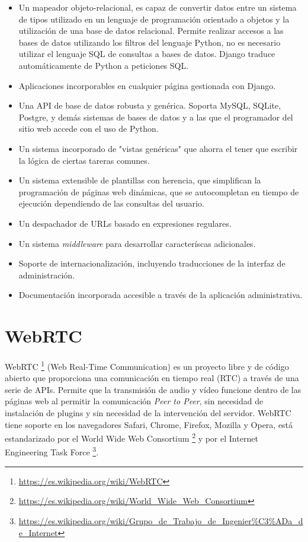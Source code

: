 \documentclass[a4paper, 12pt]{book}
\begin{document}
\begin{itemize}
\item Un mapeador objeto-relacional, es capaz de convertir datos entre un sistema de tipos utilizado en un lenguaje de programación orientado a objetos y la utilización de una base de datos relacional. Permite realizar accesos a las bases de datos utilizando los filtros del lenguaje Python, no es necesario utilizar el lenguaje SQL de consultas a bases de datos. Django traduce automáticamente de Python a peticiones SQL.

\item Aplicaciones incorporables en cualquier página gestionada con Django.

\item Una API de base de datos robusta y genérica. Soporta MySQL, SQLite, Postgre, y demás sistemas de bases de datos y a las que el programador del sitio web accede con el uso de Python.

\item Un sistema incorporado de "vistas genéricas" que ahorra el tener que escribir la lógica de ciertas tareras comunes.

\item Un sistema extensible de plantillas con herencia, que simplifican la programación de páginas web dinámicas, que se autocompletan en tiempo de ejecución
dependiendo de las consultas del usuario.

\item Un despachador de URLs basado en expresiones regulares.

\item Un sistema \textit{middleware} para desarrollar caracteríscas adicionales.

\item Soporte de internacionalización, incluyendo traducciones de la interfaz de administración.

\item Documentación incorporada accesible a través de la aplicación administrativa.
\end{itemize}

\section{WebRTC}
\label{sec:webrtc}

WebRTC \footnote{\url{https://es.wikipedia.org/wiki/WebRTC}} \cite{webrtc} (Web Real-Time Communication) es un proyecto libre y de código abierto que proporciona una comunicación en tiempo real (RTC) a través de una serie de APIs. Permite que la transmisión de audio y vídeo funcione dentro de las páginas web al permitir la comunicación \textit{Peer to Peer}, sin necesidad de instalación de plugins y sin necesidad de la intervención del servidor. WebRTC tiene soporte en los navegadores Safari, Chrome, Firefox, Mozilla y Opera, está estandarizado por el World Wide Web Consortium \footnote{\url{https://es.wikipedia.org/wiki/World_Wide_Web_Consortium}} y por el Internet Engineering Task Force \footnote{\url{https://es.wikipedia.org/wiki/Grupo_de_Trabajo_de_Ingenier\%C3\%ADa_de_Internet}}.
\end{document}
